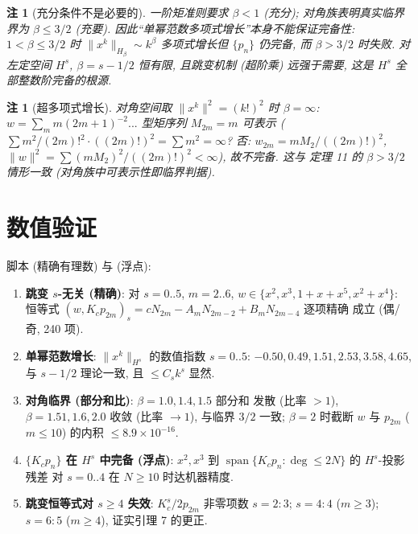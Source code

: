 \documentclass[UTF8]{ctexart}
\newtheorem{remark}[theorem]{注}
\begin{document}
\begin{remark}[充分条件不是必要的]
	一阶矩准则要求 $\beta < 1$ (充分); 对角族表明真实临界界为
	$\beta \leq 3/2$ (充要). 因此``单幂范数多项式增长''本身不能保证完备性:
	$1 < \beta \leq 3/2$ 时 $\|x^k\|_{H_\beta} \sim k^\beta$ 多项式增长但
	$\{p_n\}$ 仍完备, 而 $\beta > 3/2$ 时失败. 对左定空间 $H^s$,
	$\beta = s - 1/2$ 恒有限, 且跳变机制 (超阶乘) 远强于需要,
	这是 $H^s$ 全部整数阶完备的根源.
\end{remark}

\begin{remark}[超多项式增长]
	对角空间取 $\|x^k\|^2 = (k!)^2$ 时 $\beta = \infty$: $w = \sum_m
	m(2m+1)^{-2}...$ 型矩序列 $M_{2m} = m$ 可表示 ($\sum m^2/(2m)!^2
	\cdot ((2m)!)^2 = \sum m^2 = \infty$? 否: $w_{2m} = mM_2/((2m)!)^2$,
	$\|w\|^2 = \sum (mM_2)^2/((2m)!)^2 < \infty$), 故不完备. 这与
	定理 11 的 $\beta > 3/2$ 情形一致 (对角族中可表示性即临界判据).
\end{remark}

\section{数值验证}

脚本  (精确有理数) 与
 (浮点):
\begin{enumerate}
	\item \textbf{跳变 $s$-无关 (精确)}: 对 $s = 0..5$, $m = 2..6$,
		$w \in \{x^2, x^3, 1+x+x^5, x^2+x^4\}$: 恒等式
		$(w, K_c p_{2m})_s = cN_{2m} - A_mN_{2m-2} + B_mN_{2m-4}$ 逐项精确
		成立 (偶/奇, 240 项).
	\item \textbf{单幂范数增长}: $\|x^k\|_{H^s}$ 的数值指数 $s = 0..5$:
		$-0.50, 0.49, 1.51, 2.53, 3.58, 4.65$, 与 $s - 1/2$ 理论一致,
		且 $\leq C_s k^s$ 显然.
	\item \textbf{对角临界 (部分和比)}: $\beta = 1.0, 1.4, 1.5$ 部分和
		发散 (比率 $> 1$), $\beta = 1.51, 1.6, 2.0$ 收敛 (比率 $\to 1$),
		与临界 $3/2$ 一致; $\beta = 2$ 时截断 $w$ 与 $p_{2m}$
		($m \leq 10$) 的内积 $\leq 8.9\times10^{-16}$.
	\item \textbf{$\{K_c p_n\}$ 在 $H^s$ 中完备 (浮点)}: $x^2, x^3$ 到
		$\operatorname{span}\{K_c p_n : \deg \leq 2N\}$ 的 $H^s$-投影残差
		对 $s = 0..4$ 在 $N \geq 10$ 时达机器精度.
	\item \textbf{跳变恒等式对 $s \geq 4$ 失效}: $K_c^s/2 p_{2m}$ 非零项数
		$s=2: 3$; $s=4: 4$ ($m \geq 3$); $s=6: 5$ ($m \geq 4$),
		证实引理 7 的更正.
\end{enumerate}
\end{document}
